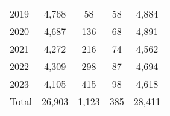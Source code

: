\documentclass{article}
\begin{document}
\begin{table}[!h]
\begin{tabular}{lllll}
\multicolumn{1}{l}{\hspace{1em}2019} &
  \multicolumn{1}{|c}{4,768} &
  \multicolumn{1}{c}{58} &
  \multicolumn{1}{c}{58} &
  \multicolumn{1}{c}{4,884} \\
\multicolumn{1}{l}{\hspace{1em}2020} &
  \multicolumn{1}{|c}{4,687} &
  \multicolumn{1}{c}{136} &
  \multicolumn{1}{c}{68} &
  \multicolumn{1}{c}{4,891} \\
\multicolumn{1}{l}{\hspace{1em}2021} &
  \multicolumn{1}{|c}{4,272} &
  \multicolumn{1}{c}{216} &
  \multicolumn{1}{c}{74} &
  \multicolumn{1}{c}{4,562} \\
\multicolumn{1}{l}{\hspace{1em}2022} &
  \multicolumn{1}{|c}{4,309} &
  \multicolumn{1}{c}{298} &
  \multicolumn{1}{c}{87} &
  \multicolumn{1}{c}{4,694} \\
\multicolumn{1}{l}{\hspace{1em}2023} &
  \multicolumn{1}{|c}{4,105} &
  \multicolumn{1}{c}{415} &
  \multicolumn{1}{c}{98} &
  \multicolumn{1}{c}{4,618} \\
\cline{1-5}
\multicolumn{1}{l}{\hspace{1em}Total} &
  \multicolumn{1}{|c}{26,903} &
  \multicolumn{1}{c}{1,123} &
  \multicolumn{1}{c}{385} &
  \multicolumn{1}{c}{28,411} \\
\cline{1-5}
\end{tabular}
\end{table}
\end{document}

